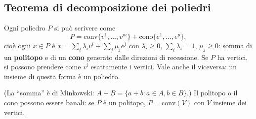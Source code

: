 \subsection{Teorema di decomposizione dei poliedri}
\begin{prop}
Ogni poliedro $P$ si può scrivere come
\[ P=\mathrm{conv}\{v^1,\dots,v^m\}+\mathrm{cono}\{e^1,\dots,e^p\}, \]
cioè ogni $x\in P$ è $x=\sum_{i}\lambda_iv^i+\sum_j\mu_je^j$ con $\lambda_i\ge0$, $\sum_i\lambda_i=1$, $\mu_j\ge0$: somma di un \textbf{politopo} e di un \textbf{cono} generato dalle direzioni di recessione. Se $P$ ha vertici, si possono prendere come $v^i$ esattamente i vertici. Vale anche il viceversa: un insieme di questa forma è un poliedro.
\end{prop}
(La ``somma'' è di Minkowski: $A+B=\{a+b: a\in A, b\in B\}$.) Il politopo o il cono possono essere banali: se $P$ è un politopo, $P=\mathrm{conv}(V)$ con $V$ insieme dei vertici.

